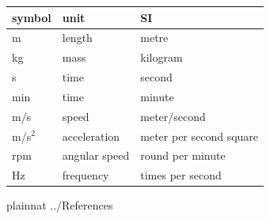 \documentclass[12pt]{article}
\begin{document}
\renewcommand{\arraystretch}{1.2}
\noindent \begin{tabular}{l l l}
    \toprule
    \textbf{symbol}    & \textbf{unit}   & \textbf{SI}                       \\
    \midrule
    \si{\metre}        & length          & metre                             \\
    \si{\kilogram}     & mass            & kilogram                          \\
    \si{\second}       & time            & second                            \\
    \si{\minute}       & time            & minute                            \\

    \si{m/s}           & speed           & meter/second                      \\
    m/s$^2$            & acceleration    & meter per second square           \\
    rpm & angular speed          & round per minute                  \\
    Hz       & frequency           & times per second                            \\

    \bottomrule
\end{tabular}

\newpage
 {plainnat}
 {../References}
\end{document}
